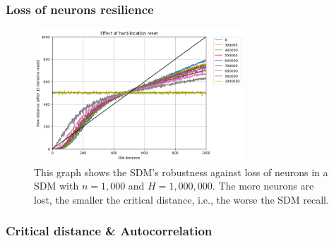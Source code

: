 \documentclass{beamer}
\begin{document}
\begin{frame}
\frametitle{Loss of neurons resilience}
\begin{figure}
\centering\includegraphics[width=0.7\textwidth]{./images02/new-images/sdm-neuron-death-1m.png}
\caption{This graph shows the SDM's robustness against loss of neurons in a SDM with $n=1,000$ and $H=1,000,000$. The more neurons are lost, the smaller the critical distance, i.e., the worse the SDM recall.
\label{fig:sdm-neuron-death-1m}}
\end{figure}
\end{frame}


\begin{frame}
\frametitle{Critical distance \& Autocorrelation}
\begin{figure}
\end{figure}
\end{frame}
\end{document}
